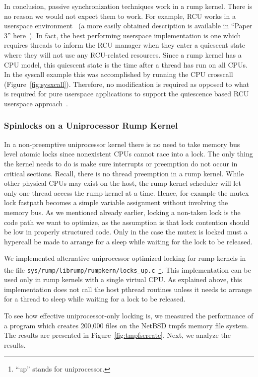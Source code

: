 In conclusion, passive synchronization techniques work in a rump
kernel.  There is no reason we would not expect them to work.  For
example, RCU works in a userspace environment~\cite{desnoyers:urcu}
(a more easily obtained description is available in ``Paper 3''
here~\cite{desnoyers:phd}).  In fact, the best performing userspace
implementation is one which requires threads to inform the RCU
manager when they enter a quiescent state where they will not use
any RCU-related resources.  Since a rump kernel has a CPU model,
this quiescent state is the time after a thread has run on all
CPUs.  In the syscall example this was accomplished by running the
CPU crosscall (Figure~\ref{fig:sysxcall}).  Therefore, no modification is
required as opposed to what is required for pure userspace applications to
support the quiescence based RCU userspace approach~\cite{desnoyers:urcu}.

\subsubsection{Spinlocks on a Uniprocessor Rump Kernel}
\label{sect:spinlockopt}

In a non-preemptive uniprocessor kernel there is no need to take
memory bus level atomic locks since nonexistent CPUs cannot race
into a lock.  The only thing the kernel needs to do is make sure
interrupts or preemption do not occur in critical sections.
Recall, there is no thread preemption in a rump kernel.
While other physical CPUs may exist on the host, the rump kernel
scheduler will let only one thread access the rump kernel at a
time.  Hence, for example the mutex lock fastpath becomes a simple
variable assignment without involving the memory bus.  As we
mentioned already earlier, locking a non-taken lock is the code
path we want to optimize, as the assumption is that lock contention
should be low in properly structured code.  Only in the case the
mutex is locked must a hypercall be made to arrange for a sleep
while waiting for the lock to be released.

We implemented alternative uniprocessor optimized locking for rump
kernels in the file \verb+sys/rump/librump/rumpkern/locks_up.c+~\footnote
{
	``up'' stands for uniprocessor.
}.
This implementation can be used only in rump kernels with
a single virtual CPU.  As explained above, this implementation
does not call the host pthread routines unless it needs to arrange
for a thread to sleep while waiting for a lock to be released.

To see how effective uniprocessor-only locking is, we measured the
performance of a program which creates 200,000 files on the NetBSD
tmpfs memory file system.  The results are presented in
Figure~\ref{fig:tmpfscreate}.  Next, we analyze the results.

